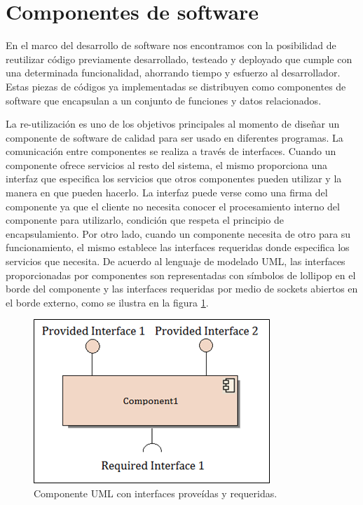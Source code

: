 \section{Componentes de software\label{sec:Componentes-de-software}}

En el marco del desarrollo de software nos encontramos con la posibilidad
de reutilizar código previamente desarrollado, testeado y deployado
que cumple con una determinada funcionalidad, ahorrando tiempo y esfuerzo
al desarrollador. Estas piezas de códigos ya implementadas se distribuyen
como componentes de software que encapsulan a un conjunto de funciones
y datos relacionados. 

La re-utilización es uno de los objetivos principales al momento de
diseñar un componente de software de calidad para ser usado en diferentes
programas. La comunicación entre componentes se realiza a través de
interfaces. Cuando un componente ofrece servicios al resto del sistema,
el mismo proporciona una interfaz que especifica los servicios que
otros componentes pueden utilizar y la manera en que pueden hacerlo.
La interfaz puede verse como una firma del componente ya que el cliente
no necesita conocer el procesamiento interno del componente para utilizarlo,
condición que respeta el principio de encapsulamiento. Por otro lado,
cuando un componente necesita de otro para su funcionamiento, el mismo
establece las interfaces requeridas donde especifica los servicios
que necesita. De acuerdo al lenguaje de modelado \ac{UML}, las interfaces
proporcionadas por componentes son representadas con símbolos de lollipop
en el borde del componente y las interfaces requeridas por medio de
sockets abiertos en el borde externo, como se ilustra en la figura
\ref{fig:UML-component}. 

\begin{figure}
\begin{centering}
\includegraphics[scale=0.9]{images/UML-component}
\par\end{centering}

\caption{Componente UML con interfaces proveídas y requeridas.\label{fig:UML-component}}
\end{figure}


